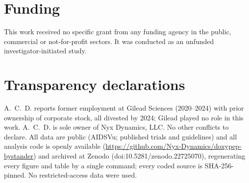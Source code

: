\documentclass[12pt,a4paper]{article}
\begin{document}
\section*{Funding}
This work received no specific grant from any funding agency in the public,
commercial or not-for-profit sectors. It was conducted as an unfunded
investigator-initiated study.

\section*{Transparency declarations}
A.~C.~D. reports former employment at Gilead Sciences (2020--2024) with prior
ownership of corporate stock, all divested by 2024; Gilead played no role in this
work. A.~C.~D. is sole owner of Nyx Dynamics, LLC. No other conflicts to declare.
All data are public (AIDSVu; published trials and guidelines) and all analysis
code is openly available (\url{https://github.com/Nyx-Dynamics/doxypep-bystander})
and archived at Zenodo (doi:10.5281/zenodo.22725070), regenerating every figure
and table by a single command; every coded source is SHA-256-pinned. No
restricted-access data were used.


\end{document}
